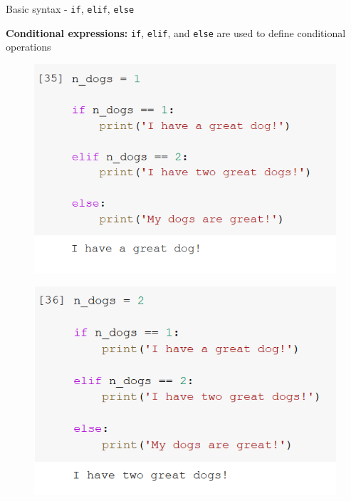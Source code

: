 \documentclass[aspectratio=169]{beamer}
\begin{document}
\begin{frame}{Basic syntax - \texttt{if}, \texttt{elif}, \texttt{else}}

        \textbf{Conditional expressions:}
	\texttt{if}, \texttt{elif}, and \texttt{else} are used to define conditional operations

	\begin{multicols}{3}

		\begin{figure}
			\centering
			\includegraphics[width=\linewidth]{img/if.png}
		\end{figure}
		\begin{figure}
			\centering
			\includegraphics[width=\linewidth]{img/elif.png}
		\end{figure}
		\begin{figure}
			\centering

\end{figure}
\end{multicols}
\end{frame}
\end{document}
